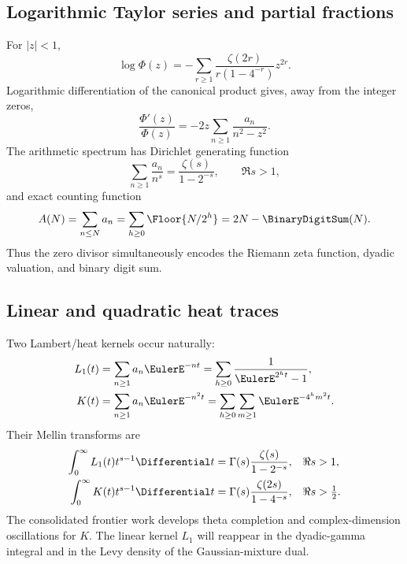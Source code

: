 \documentclass[11pt]{article}
\theoremstyle{definition}
\theoremstyle{remark}
\begin{document}
\subsection{Logarithmic Taylor series and partial fractions}

For $|z|<1$,
\begin{equation}
 \boxed{\quad
 \log\Phi(z)=-\sum_{r\ge1}
 \frac{\zeta(2r)}{r(1-4^{-r})}z^{2r}.
 \quad}                                                  \label{p2:eq:logPhi-series}
\end{equation}
Logarithmic differentiation of the canonical product gives, away from the integer zeros,
\begin{equation}
 \frac{\Phi'(z)}{\Phi(z)}
 =-2z\sum_{n\ge1}\frac{a_n}{n^2-z^2}.                   \label{p2:eq:Phi-logderivative}
\end{equation}
The arithmetic spectrum has Dirichlet generating function
\begin{equation}
 \sum_{n\ge1}\frac{a_n}{n^s}
 =\frac{\zeta(s)}{1-2^{-s}},\qquad \Re s>1,              \label{p2:eq:a-Dirichlet}
\end{equation}
and exact counting function
\begin{equation}
 A(N)=\sum_{n\le N}a_n
 =\sum_{h\ge0}\Floor{N/2^h}
 =2N-\BinaryDigitSum(N).                                             \label{p2:eq:a-count}
\end{equation}
Thus the zero divisor simultaneously encodes the Riemann zeta function, dyadic valuation,
and binary digit sum.

\subsection{Linear and quadratic heat traces}

Two Lambert/heat kernels occur naturally:
\begin{align}
 L_1(t)&=\sum_{n\ge1}a_n\EulerE^{-nt}
       =\sum_{h\ge0}\frac{1}{\EulerE^{2^ht}-1},               \label{p2:eq:L1}\\
 K(t)&=\sum_{n\ge1}a_n\EulerE^{-n^2t}
       =\sum_{h\ge0}\sum_{m\ge1}\EulerE^{-4^hm^2t}.          \label{p2:eq:Kheat}
\end{align}
Their Mellin transforms are
\begin{align}
 \int_0^\infty L_1(t)t^{s-1}\Differential t
 &=\Gamma(s)\frac{\zeta(s)}{1-2^{-s}},&&\Re s>1,
                                                               \label{p2:eq:L1-Mellin}\\
 \int_0^\infty K(t)t^{s-1}\Differential t
 &=\Gamma(s)\frac{\zeta(2s)}{1-4^{-s}},&&\Re s>\tfrac12.
                                                               \label{p2:eq:K-Mellin}
\end{align}
The consolidated frontier work develops theta completion and complex-dimension oscillations
for $K$.  The linear kernel $L_1$ will reappear in the dyadic-gamma integral and in the Levy
density of the Gaussian-mixture dual.
\end{document}
